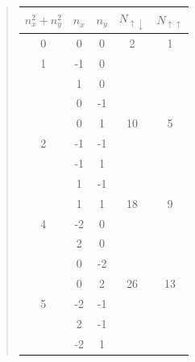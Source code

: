 \documentclass[%
oneside,                 %
final,                   %
10pt]{article}
\begin{document}
\begin{quote}
\begin{tabular}{ccccc}
\hline
\multicolumn{1}{c}{ $n_{x}^{2}+n_{y}^{2}$ } & \multicolumn{1}{c}{ $n_{x}$ } & \multicolumn{1}{c}{ $n_{y}$ } & \multicolumn{1}{c}{ $N_{\uparrow \downarrow }$ } & \multicolumn{1}{c}{ $N_{\uparrow \uparrow }$ } \\
\hline
0                     & 0       & 0       & 2                          & 1                        \\
\hline
1                     & -1      & 0       &                            &                          \\
                      & 1       & 0       &                            &                          \\
                      & 0       & -1      &                            &                          \\
                      & 0       & 1       & 10                         & 5                        \\
\hline
2                     & -1      & -1      &                            &                          \\
                      & -1      & 1       &                            &                          \\
                      & 1       & -1      &                            &                          \\
                      & 1       & 1       & 18                         & 9                        \\
\hline
4                     & -2      & 0       &                            &                          \\
                      & 2       & 0       &                            &                          \\
                      & 0       & -2      &                            &                          \\
                      & 0       & 2       & 26                         & 13                       \\
\hline
5                     & -2      & -1      &                            &                          \\
                      & 2       & -1      &                            &                          \\
                      & -2      & 1       &                            &                          \\

\end{tabular}
\end{quote}
\end{document}
